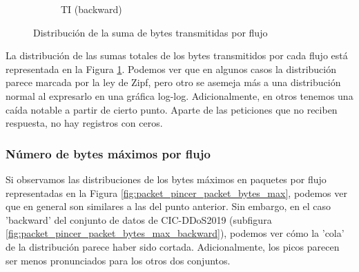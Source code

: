 \begin{figure}[H]
\begin{subfigure}[b]{0.26\textwidth}
        \caption{TI (backward)}
    \end{subfigure}
    \hfill
       \caption{Distribución de la suma de bytes transmitidas por flujo}
       \label{fig:packet_pincer_packet_bytes_sum}
\end{figure}

La distribución de las sumas totales de los bytes transmitidos por cada flujo está representada en la Figura \ref{fig:packet_pincer_packet_bytes_sum}. Podemos ver que en algunos casos la distribución parece marcada por la ley de Zipf, pero otro se asemeja más a una distribución normal al expresarlo en una gráfica log-log. Adicionalmente, en otros tenemos una caída notable a partir de cierto punto. Aparte de las peticiones que no reciben respuesta, no hay registros con ceros.

\subsubsection{Número de bytes máximos por flujo}

Si observamos las distribuciones de los bytes máximos en paquetes por flujo representadas en la Figura \ref{fig:packet_pincer_packet_bytes_max}, podemos ver que en general son similares a las del punto anterior. Sin embargo, en el caso 'backward' del conjunto de datos de CIC-DDoS2019 (subfigura \ref{fig:packet_pincer_packet_bytes_max_backward}), podemos ver cómo la 'cola' de la distribución parece haber sido cortada. Adicionalmente, los picos parecen ser menos pronunciados para los otros dos conjuntos.

